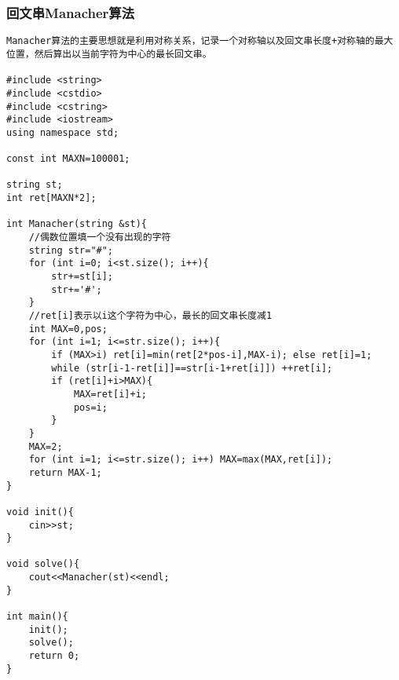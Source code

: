 \subsubsection{回文串Manacher算法}
\begin{verbatim}
Manacher算法的主要思想就是利用对称关系，记录一个对称轴以及回文串长度+对称轴的最大位置，然后算出以当前字符为中心的最长回文串。

#include <string>
#include <cstdio>
#include <cstring>
#include <iostream>
using namespace std;

const int MAXN=100001;

string st;
int ret[MAXN*2];

int Manacher(string &st){
    //偶数位置填一个没有出现的字符
    string str="#";
    for (int i=0; i<st.size(); i++){
        str+=st[i];
        str+='#';
    }
    //ret[i]表示以i这个字符为中心，最长的回文串长度减1
    int MAX=0,pos;
    for (int i=1; i<=str.size(); i++){
        if (MAX>i) ret[i]=min(ret[2*pos-i],MAX-i); else ret[i]=1;
        while (str[i-1-ret[i]]==str[i-1+ret[i]]) ++ret[i];
        if (ret[i]+i>MAX){
            MAX=ret[i]+i;
            pos=i;
        }
    }
    MAX=2;
    for (int i=1; i<=str.size(); i++) MAX=max(MAX,ret[i]);
    return MAX-1;
}

void init(){
    cin>>st;
}

void solve(){
    cout<<Manacher(st)<<endl;
}

int main(){
    init();
    solve();
    return 0;
}
\end{verbatim} 
